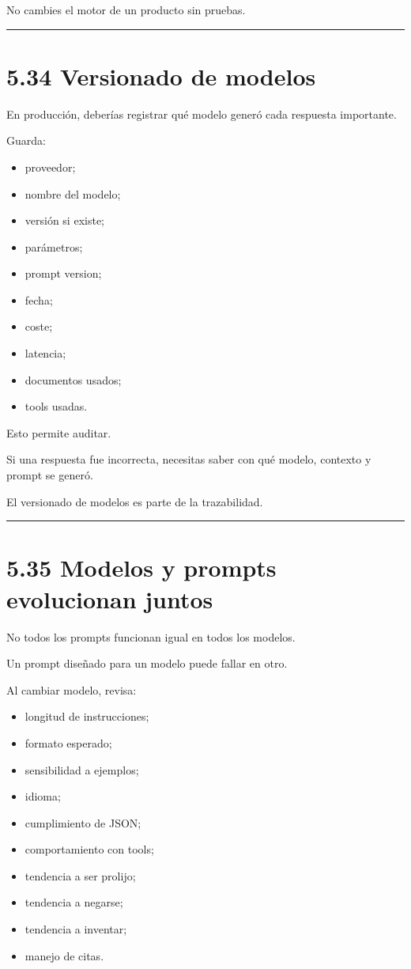 No cambies el motor de un producto sin pruebas.

\begin{center}\rule{0.5\linewidth}{0.5pt}\end{center}

\section{5.34 Versionado de modelos}\label{versionado-de-modelos}

En producción, deberías registrar qué modelo generó cada respuesta
importante.

Guarda:

\begin{itemize}
\tightlist
\item
  proveedor;
\item
  nombre del modelo;
\item
  versión si existe;
\item
  parámetros;
\item
  prompt version;
\item
  fecha;
\item
  coste;
\item
  latencia;
\item
  documentos usados;
\item
  tools usadas.
\end{itemize}

Esto permite auditar.

Si una respuesta fue incorrecta, necesitas saber con qué modelo,
contexto y prompt se generó.

El versionado de modelos es parte de la trazabilidad.

\begin{center}\rule{0.5\linewidth}{0.5pt}\end{center}

\section{5.35 Modelos y prompts evolucionan
juntos}\label{modelos-y-prompts-evolucionan-juntos}

No todos los prompts funcionan igual en todos los modelos.

Un prompt diseñado para un modelo puede fallar en otro.

Al cambiar modelo, revisa:

\begin{itemize}
\tightlist
\item
  longitud de instrucciones;
\item
  formato esperado;
\item
  sensibilidad a ejemplos;
\item
  idioma;
\item
  cumplimiento de JSON;
\item
  comportamiento con tools;
\item
  tendencia a ser prolijo;
\item
  tendencia a negarse;
\item
  tendencia a inventar;
\item
  manejo de citas.
\end{itemize}


